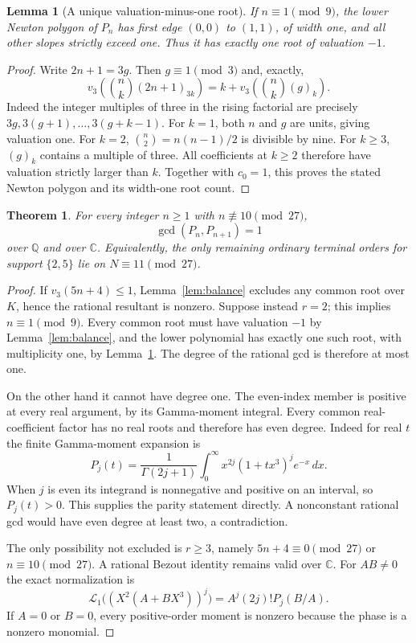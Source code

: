 \documentclass[11pt]{article}
\newtheorem{lemma}{Lemma}
\newtheorem{theorem}{Theorem}
\newcommand{\Q}{\mathbb Q}
\begin{document}
\begin{lemma}[A unique valuation-minus-one root]\label{lem:one-root}
If $n\equiv1\pmod9$, the lower Newton polygon of $P_n$ has first
edge $(0,0)$ to $(1,1)$, of width one, and all other slopes
strictly exceed one. Thus it has exactly one root of valuation $-1$.
\end{lemma}
\begin{proof}
Write $2n+1=3g$. Then $g\equiv1\pmod3$ and, exactly,
\[
 v_3\!\left(\binom nk(2n+1)_{3k}\right)
 =k+v_3\!\left(\binom nk(g)_k\right).
\]
Indeed the integer multiples of three in the rising factorial
are precisely $3g,3(g+1),\ldots,3(g+k-1)$.
For $k=1$, both $n$ and $g$ are units, giving valuation one.
For $k=2$, $\binom n2=n(n-1)/2$ is divisible by nine.
For $k\ge3$, $(g)_k$ contains a multiple of three.
All coefficients at $k\ge2$ therefore have valuation strictly
larger than $k$. Together with $c_0=1$, this proves the stated
Newton polygon and its width-one root count.
\end{proof}

\begin{theorem}\label{thm:new-ray}
For every integer $n\ge1$ with $n\not\equiv10\pmod{27}$,
\[
 \gcd(P_n,P_{n+1})=1
\]
over $\Q$ and over $\mathbb C$.
Equivalently, the only remaining ordinary terminal orders for
support $\{2,5\}$ lie on $N\equiv11\pmod{27}$.
\end{theorem}
\begin{proof}
If $v_3(5n+4)\le1$, Lemma~\ref{lem:balance} excludes any common
root over $K$, hence the rational resultant is nonzero.
Suppose instead $r=2$; this implies $n\equiv1\pmod9$.
Every common root must have valuation $-1$ by
Lemma~\ref{lem:balance}, and the lower polynomial has exactly one
such root, with multiplicity one, by Lemma~\ref{lem:one-root}.
The degree of the rational gcd is therefore at most one.

On the other hand it cannot have degree one. The even-index member
is positive at every real argument, by its Gamma-moment integral.
Every common real-coefficient factor has no real roots and therefore
has even degree. Indeed for real $t$ the finite Gamma-moment expansion is
\[
 P_j(t)=\frac1{\Gamma(2j+1)}
       \int_0^\infty x^{2j}(1+tx^3)^j e^{-x}\,dx.
\]
When $j$ is even its integrand is nonnegative and positive on an
interval, so $P_j(t)>0$. This supplies the parity statement directly.
A nonconstant rational gcd would have even degree at least two,
a contradiction.

The only possibility not excluded is $r\ge3$, namely
$5n+4\equiv0\pmod{27}$ or $n\equiv10\pmod{27}$.
A rational Bezout identity remains valid over $\mathbb C$.
For $AB\ne0$ the exact normalization is
\[
 \mathcal L_1\bigl((X^2(A+BX^3))^j\bigr)
       =A^j(2j)!P_j(B/A).
\]
If $A=0$ or $B=0$, every positive-order moment is nonzero because
the phase is a nonzero monomial.
\end{proof}
\end{document}
